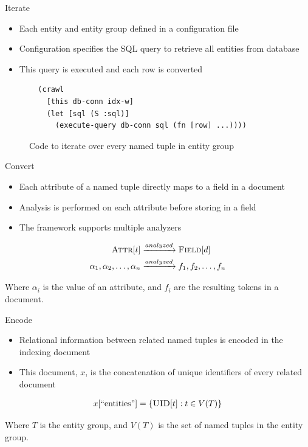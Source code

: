 \documentclass[compress]{beamer}
\newcommand{\prop}[2]{\ensuremath\textsc{#1}[#2]}
\newcommand{\attributes}[1]{\prop{Attr}{#1}}
\newcommand{\fields}[1]{\prop{Field}{#1}}
\newcommand{\uid}[1]{\prop{UID}{#1}}
\newcommand{\attribute}{\alpha}
\newcommand{\tuple}{t}
\newcommand{\doc}{d}
\newcommand{\field}{f}
\newcommand{\egraph}{T}
\begin{document}
		\begin{frame}[fragile]{Iterate}
			\begin{itemize}
				\item Each entity and entity group defined in a configuration file
				\item Configuration specifies the SQL query to retrieve all entities from database
				\item This query is executed and each row is converted
			\end{itemize}
			
			\begin{figure}
				\begin{verbatim}
  (crawl
    [this db-conn idx-w]
    (let [sql (S :sql)]
      (execute-query db-conn sql (fn [row] ...))))
				\end{verbatim}
				\caption{Code to iterate over every named tuple in entity group}
				\label{lst:crawl}
			\end{figure}
		\end{frame}
		
		\begin{frame}{Convert}
			\begin{itemize}
				\item Each attribute of a named tuple directly maps to a field in a document
				\item Analysis is performed on each attribute before storing in a field
				\item The framework supports multiple analyzers
			\end{itemize}
			
			\begin{align}
				\attributes{\tuple} &\xrightarrow{analyzed} \fields{\doc} \\
				\attribute_1, \attribute_2, \dotsc, \attribute_n &\xrightarrow{analyzed} \field_1, \field_2, \dotsc, \field_n
			\end{align}
			
			Where \(\alpha_i\) is the value of an attribute, and \(f_i\) are the resulting tokens in a document.
		\end{frame}
		
		\begin{frame}{Encode}
			\begin{itemize}
				\item Relational information between related named tuples is encoded in the \alert{indexing document}
				\item This document, \(x\), is the concatenation of unique identifiers of every related document
			\end{itemize}
			
			\begin{align}
				x[\text{``entities''}] = \left\{\uid{\tuple} : \tuple \in V(\egraph)\right\}
			\end{align}
			
			Where \(\egraph\) is the entity group, and \(V(\egraph)\) is the set of named tuples in the entity group.
		\end{frame}
		
\end{document}
